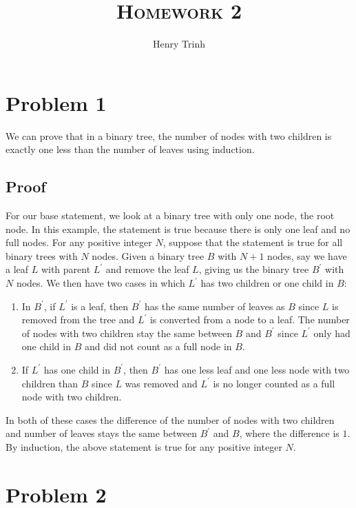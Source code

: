 \documentclass[12pt]{article}
\title{\textsc{Homework 2}}
\author{Henry Trinh}
\begin{document}
\maketitle

\newpage %
\section*{Problem 1}
We can prove that in a binary tree, the number of nodes with two 
children is exactly one less than the number of leaves using induction.
\subsection*{Proof}
For our base statement, we look at a binary tree with only one node, the root node.
In this example, the statement is true because there is only one leaf and no full nodes.
\newline
\newline
For any positive integer $N$, suppose that the statement is true for all binary trees
with $N$ nodes. Given a binary tree $B$ with $N+1$ nodes, say we have a leaf $L$ with
parent $L^\prime$ and remove the leaf $L$, giving us the binary tree $B^\prime$ with 
$N$ nodes. We then have two cases in which $L^\prime$ has two children or one child in 
$B$:
\begin{enumerate}
    \item In $B^\prime$, if $L^\prime$ is a leaf, then $B^\prime$ has the same number of leaves
    as $B$ since $L$ is removed from the tree and $L^\prime$ is converted from a node to 
    a leaf. The number of nodes with two children stay the same between $B$ and $B^\prime$ 
    since $L^\prime$ only had one child in $B$ and did not count as a full node in $B$.

    \item If $L^\prime$ has one child in $B^\prime$, then $B^\prime$ has one less leaf and one less 
    node with two children than $B$ since $L$ was removed and $L^\prime$ is no longer counted as
    a full node with two children.
\end{enumerate}
In both of these cases the difference of the number of nodes with two children and number
of leaves stays the same between $B^\prime$ and $B$, where the difference is $1$. By 
induction, the above statement is true for any positive integer $N$.

\newpage
\section*{Problem 2}
\end{document}
